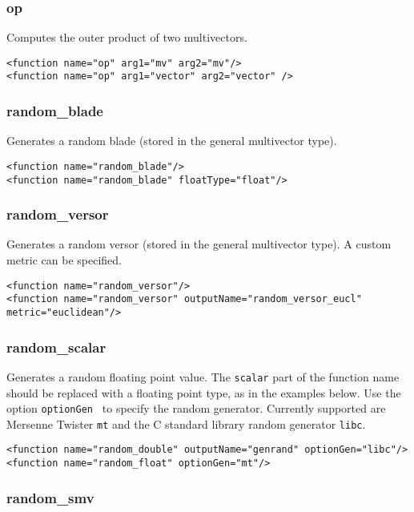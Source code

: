 \documentclass[10pt, a4paper]{article}
\begin{document}
\subsubsection*{op}

Computes the outer product of two multivectors.
\begin{verbatim}
<function name="op" arg1="mv" arg2="mv"/>
<function name="op" arg1="vector" arg2="vector" />
\end{verbatim}

\subsubsection*{random\_blade}

Generates a random blade (stored in the general multivector type).
\begin{verbatim}
<function name="random_blade"/>
<function name="random_blade" floatType="float"/>
\end{verbatim}


\subsubsection*{random\_versor}

Generates a random versor (stored in the general multivector type).
A custom metric can be specified.
\begin{verbatim}
<function name="random_versor"/>
<function name="random_versor" outputName="random_versor_eucl" metric="euclidean"/>
\end{verbatim}


\subsubsection*{random\_scalar}

Generates a random floating point value. The {\tt scalar} part of the function
name should be replaced with a floating point type, as in the examples below.
Use the option {\tt optionGen } to specify the random generator. Currently
supported are Mersenne Twister {\tt mt} and the C standard library random
generator {\tt libc}.
\begin{verbatim}
<function name="random_double" outputName="genrand" optionGen="libc"/>
<function name="random_float" optionGen="mt"/>
\end{verbatim}

\subsubsection*{random\_smv}
\end{document}
